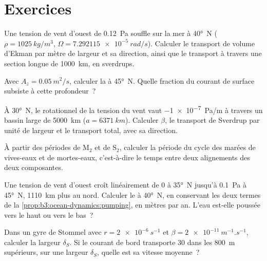 \section{Exercices}

\begin{exercise}[$\star$]\label{exo:b3:ocean-dynamics:1}
Une tension de vent d'ouest de \qty{0.12}{Pa} souffle sur la mer à \ang{40}~N
($\rho = \qty{1025}{kg/m^3}$, $\Omega = \qty{7.292115e-5}{rad/s}$).
Calculer le transport de volume d'Ekman par mètre de largeur et sa direction,
ainsi que le transport à travers une section longue de \qty{1000}{km}, en sverdrups.
\end{exercise}

\begin{exercise}[$\star$]\label{exo:b3:ocean-dynamics:2}
Avec $A_z = \qty{0.05}{m^2/s}$, calculer la  à \ang{45}~N. Quelle
fraction du courant de surface subsiste à cette profondeur~?
\end{exercise}

\begin{exercise}[$\star$]\label{exo:b3:ocean-dynamics:3}
À \ang{30}~N, le rotationnel de la tension du vent vaut \qty{-1e-7}{Pa/m} à travers un
bassin large de \qty{5000}{km} ($a = \qty{6371}{km}$). Calculer $\beta$, le
transport de Sverdrup par unité de largeur et le transport total, avec sa
direction.
\end{exercise}

\begin{exercise}[$\star$]\label{exo:b3:ocean-dynamics:4}
À partir des périodes de M$_2$ et de S$_2$, calculer la période du cycle des
marées de vives-eaux et de mortes-eaux, c'est-à-dire le temps entre deux alignements des deux
composantes.
\end{exercise}

\begin{exercise}[$\star\star$]\label{exo:b3:ocean-dynamics:5}
Une tension de vent d'ouest croît linéairement de 0 à \ang{35}~N jusqu'à
\qty{0.1}{Pa} à \ang{45}~N, \qty{1110}{km} plus au nord. Calculer le  à
\ang{40}~N, en conservant les deux termes de la \cref{prop:b3:ocean-dynamics:pumping}, en
mètres par an. L'eau est-elle poussée vers le haut ou vers le bas~?
\end{exercise}

\begin{exercise}[$\star\star$]\label{exo:b3:ocean-dynamics:6}
Dans un gyre de Stommel avec $r = \qty{2e-6}{s^{-1}}$ et $\beta =
\qty{2e-11}{m^{-1}.s^{-1}}$, calculer la largeur $\delta_S$. Si le courant de bord
transporte \qty{30}{\sverdrup} dans les \qty{800}{m} supérieurs, sur une
largeur $\delta_S$, quelle est sa vitesse moyenne~?
\end{exercise}

